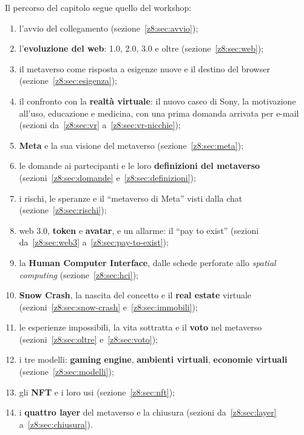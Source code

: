Il percorso del capitolo segue quello del workshop:
\begin{enumerate}
  \item l'avvio del collegamento (sezione~\ref{z8:sec:avvio});
  \item l'\textbf{evoluzione del web}: 1.0, 2.0, 3.0 e oltre
        (sezione~\ref{z8:sec:web});
  \item il metaverso come risposta a esigenze nuove e il destino del browser
        (sezione~\ref{z8:sec:esigenza});
  \item il confronto con la \textbf{realtà virtuale}: il nuovo casco di Sony,
        la motivazione all'uso, educazione e medicina, con una prima domanda
        arrivata per e-mail (sezioni da~\ref{z8:sec:vr} a~\ref{z8:sec:vr-nicchie});
  \item \textbf{Meta} e la sua visione del metaverso (sezione~\ref{z8:sec:meta});
  \item le domande ai partecipanti e le loro \textbf{definizioni del metaverso}
        (sezioni~\ref{z8:sec:domande} e~\ref{z8:sec:definizioni});
  \item i rischi, le speranze e il ``metaverso di Meta'' visti dalla chat
        (sezione~\ref{z8:sec:rischi});
  \item web 3.0, \textbf{token} e \textbf{avatar}, e un allarme: il ``pay
        to exist'' (sezioni da~\ref{z8:sec:web3} a~\ref{z8:sec:pay-to-exist});
  \item la \textbf{Human Computer Interface}, dalle schede perforate allo
        \emph{spatial computing} (sezione~\ref{z8:sec:hci});
  \item \textbf{Snow Crash}, la nascita del concetto e il \textbf{real estate}
        virtuale (sezioni~\ref{z8:sec:snow-crash} e~\ref{z8:sec:immobili});
  \item le esperienze impossibili, la vita sottratta e il \textbf{voto} nel
        metaverso (sezioni~\ref{z8:sec:oltre} e~\ref{z8:sec:voto});
  \item i tre modelli: \textbf{gaming engine}, \textbf{ambienti virtuali},
        \textbf{economie virtuali} (sezione~\ref{z8:sec:modelli});
  \item gli \textbf{NFT} e i loro usi (sezione~\ref{z8:sec:nft});
  \item i \textbf{quattro layer} del metaverso e la chiusura (sezioni
        da~\ref{z8:sec:layer} a~\ref{z8:sec:chiusura}).
\end{enumerate}

